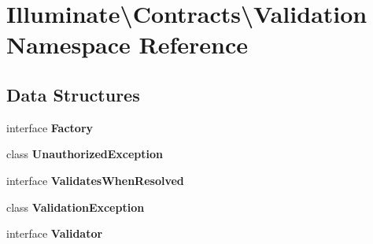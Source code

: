 \section{Illuminate\textbackslash{}Contracts\textbackslash{}Validation Namespace Reference}
\label{namespace_illuminate_1_1_contracts_1_1_validation}
\subsection*{Data Structures}
\begin{DoxyCompactItemize}
\item 
interface {\bf Factory}
\item 
class {\bf Unauthorized\+Exception}
\item 
interface {\bf Validates\+When\+Resolved}
\item 
class {\bf Validation\+Exception}
\item 
interface {\bf Validator}
\end{DoxyCompactItemize}
